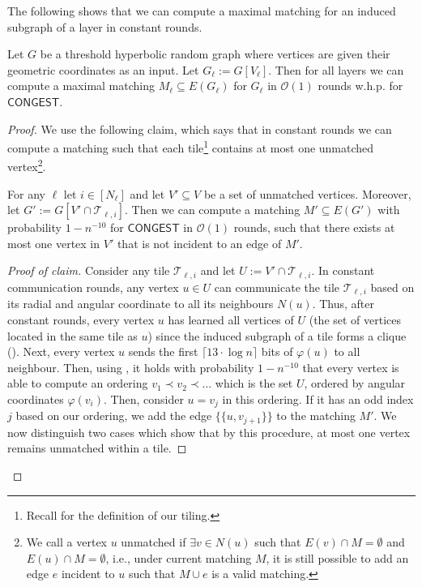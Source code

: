 \documentclass[letterpaper,11pt]{article}
\newcommand{\whp}{w.h.p.\xspace}
\newcommand{\1}{\mathbb I}
\newcommand{\bigO}{\mathcal{O}}
\newcommand{\CONGEST}{\ensuremath{\mathsf{CONGEST}}\xspace}
\newcommand{\tiletile}[2]{\mathcal{T}_{#1,#2}}
\begin{document}
The following shows that we can compute a maximal matching for an induced subgraph of a layer in constant rounds.
%
\begin{lemma}\label{lem:matching-in-layer}
     Let $G$ be a threshold hyperbolic random graph where vertices are given their geometric coordinates as an input. Let $G_\ell := G[V_\ell]$. Then for all layers we can compute a maximal matching $M_{\ell} \subseteq E(G_\ell)$ for $G_\ell$ in $\bigO(1)$ rounds \whp for \CONGEST.
\end{lemma}
%
\begin{proof}
    We use the following claim, which says that in constant rounds we can compute a matching such that each tile\footnote{Recall  for the definition of our tiling.} contains at most one unmatched vertex\footnote{We call a vertex $u$ unmatched if $\exists v \in N(u)$ such that $E(v) \cap M = \emptyset$ and $E(u) \cap M = \emptyset$, i.e., under current matching $M$, it is still possible to add an edge $e$ incident to $u$ such that $M \cup e$ is a valid matching.}.
%
    \begin{claim}\label{claim:tile-single-vertex}
         For any $\ell$ let $i \in [N_\ell]$ and let $V'\subseteq V$ be a set of unmatched vertices. Moreover, let $G' := G[V' \cap \tiletile{\ell}{i}]$. Then we can compute a matching $M' \subseteq E(G')$ with probability $1 - n^{-10}$ for \CONGEST in $\bigO(1)$ rounds, such that there exists at most one vertex in $V'$ that is not incident to an edge of $M'$.
    \end{claim}
%
    {
\renewcommand{\qedsymbol}{$\blacksquare$} %
\begin{proof}[Proof of claim] Consider any tile  $\tiletile{\ell}{i}$ and let $U:= V' \cap \tiletile{\ell}{i}$. In constant communication rounds, any vertex $u \in U$ can communicate the tile $\tiletile{\ell}{i}$ based on its radial and angular coordinate to all its neighbours $N(u)$. Thus, after constant rounds, every vertex $u$ has learned all vertices of $U$ (the set of vertices located in the same tile as $u$) since the induced subgraph of a tile forms a clique (). Next, every vertex $u$ sends the first  $\lceil 13 \cdot \log n \rceil$ bits of $\varphi(u)$ to all neighbour. Then, using , it holds with probability $1-n^{-10}$ that every vertex is able to compute an ordering $v_1 \prec v_2 \prec \dots$ which is the set $U$, ordered by angular coordinates $\varphi(v_i)$. Then, consider $u = v_{j}$ in this ordering. If it has an odd index $j$ based on our ordering, we add the edge $\{\{u,v_{j+1}\}\}$ to the matching $M'$. We now distinguish two cases which show that by this procedure, at most one vertex remains unmatched within a tile. 


\end{proof}}
\end{proof}
\end{document}

